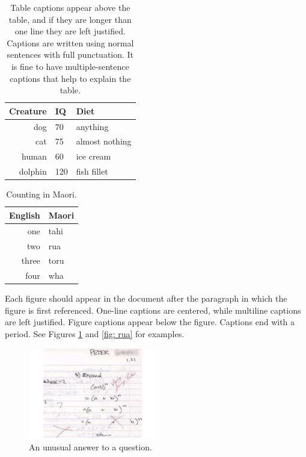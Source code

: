 \documentclass{wscpaperproc}
\theoremstyle{wsc}
\begin{document}
\begin{table}[htb]
\centering
\caption{Table captions appear above the table, and if they are longer than one line they are left justified. Captions are written using normal sentences with full punctuation. It is fine to have multiple-sentence captions that help to explain the table.\label{tab: first}}
\begin{tabular}{rll}
\hline
Creature & IQ & Diet\\ \hline
dog & 70 & anything\\
cat & 75 & almost nothing\\
human & 60 & ice cream \\
dolphin & 120 & fish fillet\\
\hline
\end{tabular}
\end{table}

\begin{table}[htb]
\centering
\caption{Counting in Maori.\label{tab: second}}
\begin{tabular}{r|l}
English & Maori \\ \hline
one & tahi \\
two & rua \\
three & toru \\
four & wha \\
\end{tabular}
\end{table}

Each figure should appear in the document after the paragraph in which the figure is first referenced. One-line captions are centered,
while multiline captions are left justified. Figure captions appear below the figure. 
Captions end with a period. 
See Figures \ref{fig: tahi} and \ref{fig: rua} for examples.

\begin{figure}[htb]
{
\centering
\includegraphics[width=0.50\textwidth]{MathExpandExpression}
\caption{An unusual answer to a question.\label{fig: tahi}}
}
\end{figure}
\end{document}
